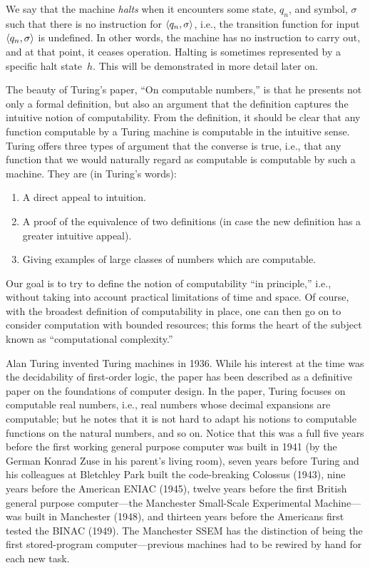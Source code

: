 \documentclass[../../../include/open-logic-section]{subfiles}
\begin{document}
\begin{explain}
We say that the machine \emph{halts} when it encounters some state,
$q_n$, and symbol, $\sigma$ such that there is no instruction for
$\langle q_n, \sigma \rangle$, i.e., the transition function for input
$\langle q_n,\sigma \rangle$ is undefined. In other words, the machine has no
instruction to carry out, and at that point, it ceases
operation. Halting is sometimes represented by a specific halt
state~$h$.  This will be demonstrated in more detail later on.
\end{explain}

\begin{digress}
The beauty of Turing's paper, ``On computable numbers,'' is that he
presents not only a formal definition, but also an argument that the
definition captures the intuitive notion of computability.
From the definition, it should be clear that any function computable
by a Turing machine is computable in the intuitive sense. Turing
offers three types of argument that the converse is true, i.e., that
any function that we would naturally regard as computable is
computable by such a machine. They are (in Turing's words):
\begin{enumerate}
\item A direct appeal to intuition.
\item A proof of the equivalence of two definitions (in case the new
  definition has a greater intuitive appeal).
\item Giving examples of large classes of numbers which are
  computable.
\end{enumerate}
Our goal is to try to define the notion of computability ``in
principle,'' i.e., without taking into account practical limitations
of time and space. Of course, with the broadest definition of
computability in place, one can then go on to consider computation
with bounded resources; this forms the heart of the subject known as
``computational complexity.''
\end{digress}

\begin{history}
Alan Turing invented Turing machines in 1936. While his interest at
the time was the decidability of first-order logic, the paper has been
described as a definitive paper on the foundations of computer
design. In the paper, Turing focuses on computable real numbers, i.e.,
real numbers whose decimal expansions are computable; but he notes
that it is not hard to adapt his notions to computable functions on
the natural numbers, and so on.  Notice that this was a full five
years before the first working general purpose computer was built in
1941 (by the German Konrad Zuse in his parent's living room), seven
years before Turing and his colleagues at Bletchley Park built the
code-breaking Colossus (1943), nine years before the American ENIAC
(1945), twelve years before the first British general purpose
computer---the Manchester Small-Scale Experimental Machine---was built in
Manchester (1948), and thirteen years before the Americans first
tested the BINAC (1949). The Manchester SSEM has the distinction of
being the first stored-program computer---previous machines had to be
rewired by hand for each new task.
\end{history}
\end{document}
